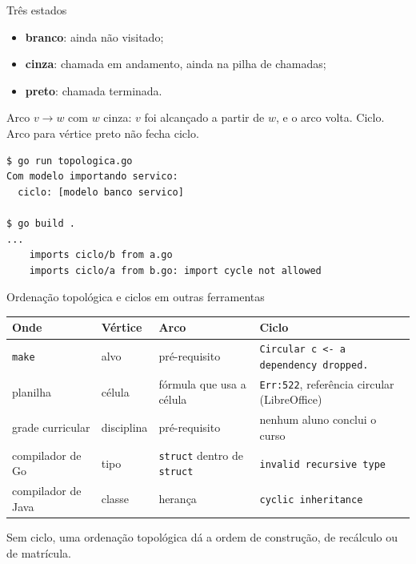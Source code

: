 \documentclass{beamer}
\begin{document}
\begin{frame}[fragile]{Três estados}
	\begin{itemize}
		\item \textbf{branco}: ainda não visitado;
		\item \textbf{cinza}: chamada em andamento, ainda na pilha de chamadas;
		\item \textbf{preto}: chamada terminada.
	\end{itemize}

	\vspace{0.1cm}
	Arco $v \to w$ com $w$ cinza: $v$ foi alcançado a partir de $w$, e o arco
	volta. Ciclo. Arco para vértice preto não fecha ciclo.

	\begin{verbatim}
$ go run topologica.go
Com modelo importando servico:
  ciclo: [modelo banco servico]

$ go build .
...
	imports ciclo/b from a.go
	imports ciclo/a from b.go: import cycle not allowed
\end{verbatim}
\end{frame}

\begin{frame}{Ordenação topológica e ciclos em outras ferramentas}
	\footnotesize
	\begin{tabular}{@{}>{\raggedright\arraybackslash}p{2.0cm}>{\raggedright\arraybackslash}p{1.6cm}>{\raggedright\arraybackslash}p{2.4cm}>{\raggedright\arraybackslash}p{3.5cm}@{}}
		\toprule
		Onde & Vértice & Arco & Ciclo \\
		\midrule
		\texttt{make} & alvo & pré-requisito &
		\texttt{Circular c <- a dependency dropped.} \\
		planilha & célula & fórmula que usa a célula &
		\texttt{Err:522}, referência circular (LibreOffice) \\
		grade curricular & disciplina & pré-requisito &
		nenhum aluno conclui o curso \\
		compilador de Go & tipo & \texttt{struct} dentro de \texttt{struct} &
		\texttt{invalid recursive type} \\
		compilador de Java & classe & herança & \texttt{cyclic inheritance} \\
		\bottomrule
	\end{tabular}

	\vspace{0.3cm}
	\small
	Sem ciclo, uma ordenação topológica dá a ordem de construção, de recálculo
	ou de matrícula.
\end{frame}
\end{document}
